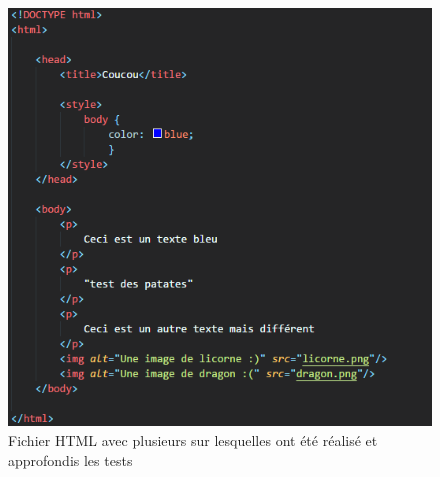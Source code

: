 \begin{figure}[ht]
\centering
\includegraphics[height=1\textwidth]{html3.png}
\caption{\label{fig:html3}Fichier HTML avec plusieurs sur lesquelles ont été réalisé et approfondis les tests}
\end{figure}